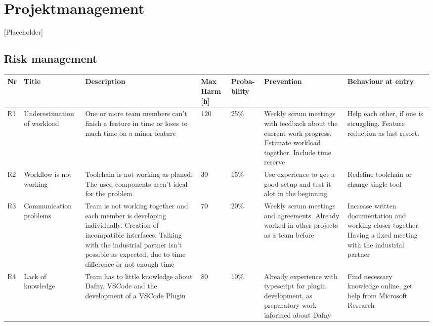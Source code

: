 \section{Projektmanagement}
[Placeholder]
\subsection{Risk management}
\begin{landscape}
	\begin{longtable}[H]
		{l|p{}| p{} | p{} | p{} | p{} | p{}}
		
		\textbf{Nr} & \textbf{Title} & \textbf{Description} & 
		\textbf{Max Harm [h]} & \textbf{Proba- bility} & \textbf{Prevention} &  
		\textbf{Behaviour at entry}\\ \hline
		
		R1 & Underestimation of workload & One or more team members can't finish a feature in time or loses to much time on a minor feature & 120 & 25\% & Weekly scrum meetings with feedback about the current work progress. Estimate workload together. Include time reserve & Help each other, if one is struggling. Feature reduction as last resort. \\ 
		
		R2 & Workflow is not working & Toolchain is not working as planed. The used components aren't ideal for the problem & 30 & 15\% & Use experience to get a good setup and test it alot in the beginning & Redefine toolchain or change single tool \\ 
		
		R3 & Communication problems & Team is not working together and each member is developing individually. Creation of incompatible interfaces. Talking with the industrial partner isn't possible as expected, due to time difference or not enough time & 70 & 20\% & Weekly scrum meetings and agreements. Already worked in other projects as a team before & Increase written documentation and working closer together. Having a fixed meeting with the industrial partner \\ 
		
		R4 & Lack of knowledge & Team has to little knowledge about Dafny, VSCode and the development of a VSCode Plugin & 80 & 10\% & Already experience with typescript for plugin development, as preparatory work informed about Dafny & Find necessary knowledge online, get help from Microsoft Research \\ 
		

\end{longtable}
\end{landscape}
